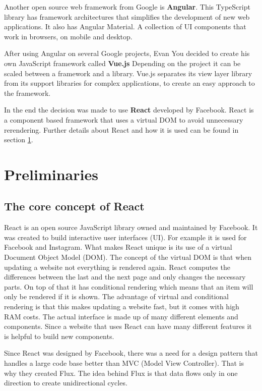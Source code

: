 \documentclass[11pt,a4paper]{article}
\begin{document}
Another open source web framework from Google is \textbf{Angular}. \cite{angular}
This TypeScript library has framework architectures that simplifies the development of new web applications.
It also has Angular Material.
A collection of UI components that work in browsers, on mobile and desktop.

After using Angular on several Google projects, Evan You decided to create his own JavaScript framework called \textbf{Vue.js} \cite{vuewiki}
Depending on the project it can be scaled between a framework and a library.
Vue.js separates its view layer library from its support libraries for complex applications, to create an easy approach to the framework. \cite{vuegit}

In the end the decision was made to use \textbf{React} developed by Facebook. 
React is a component based framework that uses a virtual DOM to avoid unnecessary rerendering.
Further details about React and how it is used can be found in section \ref{preliminaries}.


\section{Preliminaries} \label{preliminaries}
\subsection{The core concept of React} 
React is an open source JavaScript library owned and maintained by Facebook.	It was created to build interactive user interfaces (UI).
For example it is used for Facebook and Instagram.
What makes React unique is its use of a virtual Document Object Model (DOM).
The concept of the virtual DOM is that when updating a website not everything is rendered again.
React computes the differences between the last and the next page and only changes the necessary parts.
On top of that it has conditional rendering which means that an item will only be rendered if it is shown.
The advantage of virtual and conditional rendering is that this makes updating a website fast, but it comes with high RAM costs.
The actual interface is made up of many different elements and components.
Since a website that uses React can have many different features it is helpful to build new components.\cite{reactjs}

Since React was designed by Facebook, there was a need for a design pattern that handles a large code base better than MVC (Model View Controller).
That is why they created Flux.
The idea behind Flux is that data flows only in one direction to create unidirectional cycles. \cite{flux}
\end{document}
